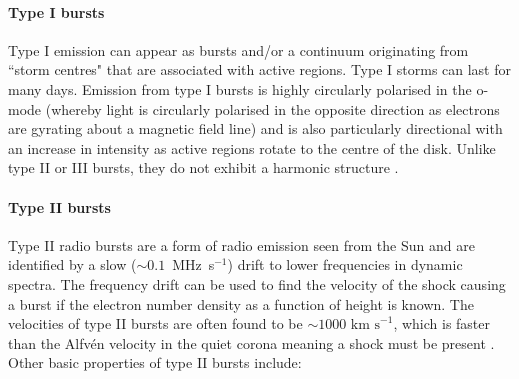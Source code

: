 \paragraph{Type I bursts}
Type I emission can appear as bursts and/or a continuum originating from ``storm centres" that are associated with active regions. Type I storms can last for many days. Emission from type I bursts is highly circularly polarised in the o-mode (whereby light is circularly polarised in the opposite direction as electrons are gyrating about a magnetic field line) and is also particularly directional with an increase in intensity as active regions rotate to the centre of the disk. Unlike type II or III bursts, they do not exhibit a harmonic structure \citep{McLean1985}.
\paragraph{Type II bursts}
Type II radio bursts are a form of radio emission seen from the Sun and are identified by a slow ($\sim 0.1$~MHz~s$^{-1}$) drift to lower frequencies in dynamic spectra. The frequency drift can be used to find the velocity of the shock causing a burst if the electron number density as a function of height is known. The velocities of type II bursts are often found to be $\sim 1000 \mbox{ km s}^{-1}$, which is faster than the Alfv\'{e}n velocity in the quiet corona meaning a shock must be present \citep{NelsonandMelrose1985}. Other basic properties of type II bursts include:
